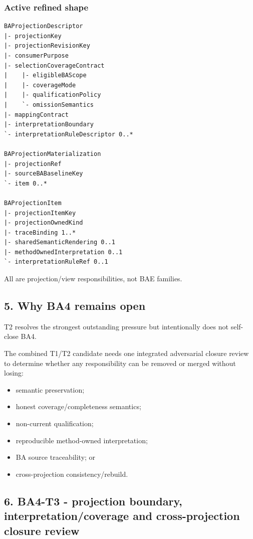 \documentclass[11pt,a4paper]{article}
\providecommand{\tightlist}{\setlength{\itemsep}{0pt}\setlength{\parskip}{0pt}}
\begin{document}
\subsubsection{Active refined shape}\label{active-refined-shape}

\begin{verbatim}
BAProjectionDescriptor
|- projectionKey
|- projectionRevisionKey
|- consumerPurpose
|- selectionCoverageContract
|    |- eligibleBAScope
|    |- coverageMode
|    |- qualificationPolicy
|    `- omissionSemantics
|- mappingContract
|- interpretationBoundary
`- interpretationRuleDescriptor 0..*

BAProjectionMaterialization
|- projectionRef
|- sourceBABaselineKey
`- item 0..*

BAProjectionItem
|- projectionItemKey
|- projectionOwnedKind
|- traceBinding 1..*
|- sharedSemanticRendering 0..1
|- methodOwnedInterpretation 0..1
`- interpretationRuleRef 0..1
\end{verbatim}

All are projection/view responsibilities, not BAE families.

\subsection{5. Why BA4 remains open}\label{5-why-ba4-remains-open}

T2 resolves the strongest outstanding pressure but intentionally does
not self-close BA4.

The combined T1/T2 candidate needs one integrated adversarial closure
review to determine whether any responsibility can be removed or merged
without losing:

\begin{itemize}
\tightlist
\item
  semantic preservation;
\item
  honest coverage/completeness semantics;
\item
  non-current qualification;
\item
  reproducible method-owned interpretation;
\item
  BA source traceability; or
\item
  cross-projection consistency/rebuild.
\end{itemize}

\subsection{6. BA4-T3 - projection boundary, interpretation/coverage and
cross-projection closure
review}\label{6-ba4-t3---projection-boundary-interpretationcoverage-and-cross-projection-closure-review}
\end{document}
